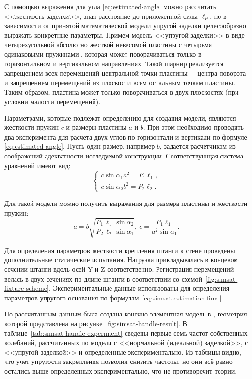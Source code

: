 С помощью выражения для угла \eqref{eq:estimated-angle} можно рассчитать <<жесткость заделки>>, зная расстояние до приложенной силы $ \ell_P $, но в зависимости от принятой математической модели упругой заделки целесообразно выражать конкретные параметры. Примем модель <<упругой заделки>> в виде четырехугольной абсолютно жесткой невесомой пластины с четырьмя одинаковыми пружинами , которая может поворачиваться только в горизонтальном и вертикальном направлениях. Такой шарнир реализуется запрещением всех перемещений центральной точки пластины~--~центра поворота и запрещением перемещений из плоскости всем остальным точкам пластины. Таким образом, пластина может только поворачиваться в двух плоскостях (при условии малости перемещений).

Параметрами, которые подлежат определению для создания модели, являются жесткости пружин $ c $ и размеры пластины $ a $ и $ b $. При этом необходимо проводить два эксперимента для расчета двух углов по горизонтали и вертикали по формуле \eqref{eq:estimated-angle}. Пусть один размер, например $ b $, задается расчетчиком из соображений адекватности исследуемой конструкции. Соответствующая система уравнений имеют вид:
\begin{equation}
	\begin{cases}
		c \sin \alpha_1 a ^ 2 = P_1 \ell_1, \\
		c \sin \alpha_2 b ^ 2 = P_2 \ell_2.
	\end{cases}
\end{equation}

Для такой модели можно получить выражения для размера пластины и жесткости пружин:
\begin{equation}
	a = b \sqrt{\frac{P_1}{P_2} \frac{\ell_1}{\ell_2} \frac{\sin \alpha_2}{\sin \alpha_1}}, \ c = \frac{P_1 \ell_1}{a ^ 2 \sin \alpha_1}. \label{eq:simsat-estimation-final}
\end{equation}

Для определения параметров жесткости крепления штанги к стене проведены дополнительные статические испытания. Нагрузка прикладывалась в концевом сечении штанги вдоль осей $ \mathrm{Y} $ и $ \mathrm{Z} $ соответственно. Регистрация перемещений велась в двух сечениях по длине штанги в соответствии со схемой~\ref{fig:simsat-fixture-scheme}. Экспериментальные данные использованы для определения параметров упругого основания по формулам~\eqref{eq:simsat-estimation-final}.

По рассчитанным данным была создана конечно-элементная модель в , геометрия которой представлена на рисунке~\ref{fig:simsat-handle-result}. В таблице~\ref{tab:simsat-handle-experiment} сведены первые семь частот собственных колебаний, рассчитанных по модели с <<нормальной (идеальной) заделкой>>, с <<упругой заделкой>> и определенные экспериментально. Из таблицы видно, что учет упругости закрепления позволил снизить частоты, но они всё равно остались выше определенных экспериментально, что не противоречит теории.

